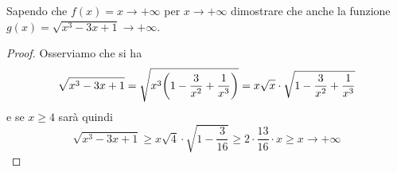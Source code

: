 \begin{example}
  Sapendo che $f(x)=x\to +\infty$ per $x\to +\infty$ dimostrare
  che anche la funzione $g(x) = \sqrt{x^3-3x+1}\to+\infty$.
  \end{example}
  \begin{proof}
    Osserviamo che si ha 
    \[
    \sqrt{x^3-3x+1} 
    =\sqrt{x^3{\left( 1-\frac 3{x^2}+\frac 1 {x^3} \right)}}
    = x\sqrt x\cdot \sqrt{1- \frac 3 {x^2}+\frac 1 {x^3}}  
    \]
e se $x\ge 4$ sarà quindi 
\[
  \sqrt{x^3-3x+1} 
    \ge x\sqrt 4 \cdot \sqrt{1-\frac 3{16}}
    \ge 2 \cdot \frac{13}{16} \cdot x \ge x \to +\infty
\] 
\end{proof}
  

